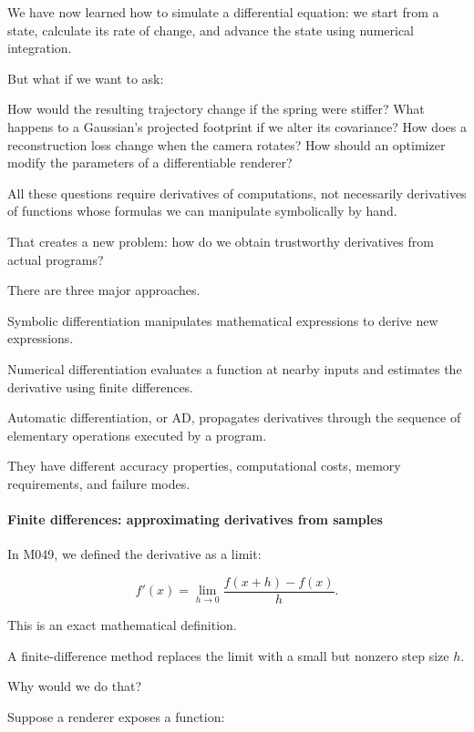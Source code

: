 We have now learned how to simulate a differential equation: we start from a state, calculate its rate of change, and advance the state using numerical integration.

But what if we want to ask:

How would the resulting trajectory change if the spring were stiffer? What happens to a Gaussian's projected footprint if we alter its covariance? How does a reconstruction loss change when the camera rotates? How should an optimizer modify the parameters of a differentiable renderer?

All these questions require derivatives of computations, not necessarily derivatives of functions whose formulas we can manipulate symbolically by hand.

That creates a new problem: how do we obtain trustworthy derivatives from actual programs?

There are three major approaches.

Symbolic differentiation manipulates mathematical expressions to derive new expressions.

Numerical differentiation evaluates a function at nearby inputs and estimates the derivative using finite differences.

Automatic differentiation, or AD, propagates derivatives through the sequence of elementary operations executed by a program.

They have different accuracy properties, computational costs, memory requirements, and failure modes.

\paragraph{Finite differences: approximating derivatives from samples}\label{02-foundations-ii-ch025-finite-differences-approximating-derivatives-from-samples}

\hypertarget{02-foundations-ii-ch025-finite-differences-approximating-derivatives-from-samples}{}

In M049, we defined the derivative as a limit:

\[
f'(x)= \lim_{h\to0} \frac{f(x+h)-f(x)}h.
\]

This is an exact mathematical definition.

A finite-difference method replaces the limit with a small but nonzero step size \(h\).

Why would we do that?

Suppose a renderer exposes a function:

